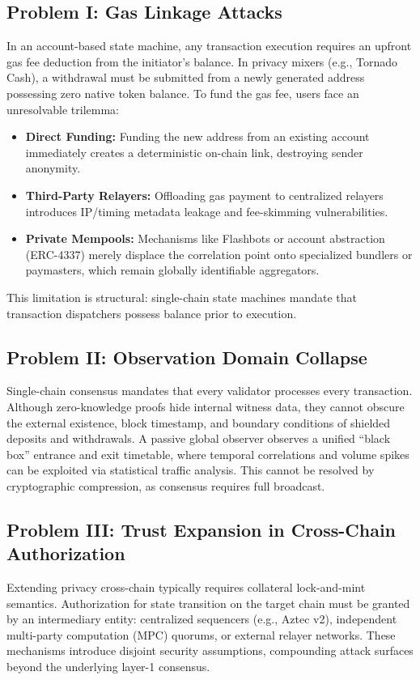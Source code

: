 \documentclass[journal,10pt,twocolumn]{IEEEtran}
\theoremstyle{definition}
\theoremstyle{remark}
\begin{document}
\subsection{Problem I: Gas Linkage Attacks}
In an account-based state machine, any transaction execution requires an upfront gas fee deduction from the initiator's balance. In privacy mixers (e.g., Tornado Cash), a withdrawal must be submitted from a newly generated address possessing zero native token balance. To fund the gas fee, users face an unresolvable trilemma:
\begin{itemize}[leftmargin=*]
    \item \textbf{Direct Funding:} Funding the new address from an existing account immediately creates a deterministic on-chain link, destroying sender anonymity.
    \item \textbf{Third-Party Relayers:} Offloading gas payment to centralized relayers introduces IP/timing metadata leakage and fee-skimming vulnerabilities.
    \item \textbf{Private Mempools:} Mechanisms like Flashbots or account abstraction (ERC-4337) merely displace the correlation point onto specialized bundlers or paymasters, which remain globally identifiable aggregators.
\end{itemize}
This limitation is structural: single-chain state machines mandate that transaction dispatchers possess balance prior to execution.

\subsection{Problem II: Observation Domain Collapse}
Single-chain consensus mandates that every validator processes every transaction. Although zero-knowledge proofs hide internal witness data, they cannot obscure the external existence, block timestamp, and boundary conditions of shielded deposits and withdrawals. A passive global observer observes a unified ``black box'' entrance and exit timetable, where temporal correlations and volume spikes can be exploited via statistical traffic analysis. This cannot be resolved by cryptographic compression, as consensus requires full broadcast.

\subsection{Problem III: Trust Expansion in Cross-Chain Authorization}
Extending privacy cross-chain typically requires collateral lock-and-mint semantics. Authorization for state transition on the target chain must be granted by an intermediary entity: centralized sequencers (e.g., Aztec v2), independent multi-party computation (MPC) quorums, or external relayer networks. These mechanisms introduce disjoint security assumptions, compounding attack surfaces beyond the underlying layer-1 consensus.
\end{document}
